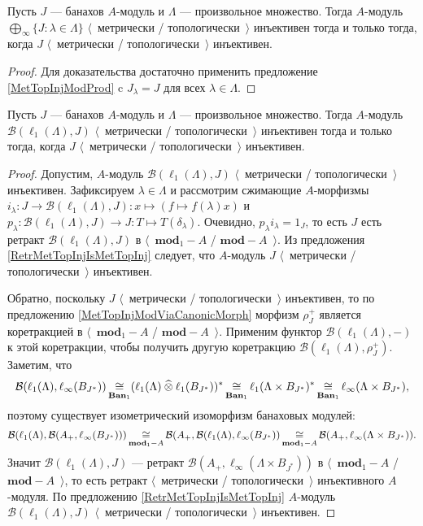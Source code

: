 \begin{corollary}\label{MetTopInjlInftySum} Пусть $J$ --- банахов $A$-модуль и $\Lambda$ --- произвольное множество. Тогда $A$-модуль  $\bigoplus_\infty\{J:\lambda\in\Lambda\}$ $\langle$~метрически / топологически~$\rangle$ инъективен тогда и только тогда, когда $J$ $\langle$~метрически / топологически~$\rangle$ инъективен.
\end{corollary}
\begin{proof} Для доказательства достаточно применить предложение \ref{MetTopInjModProd} c $J_\lambda=J$ для всех $\lambda\in\Lambda$.
\end{proof}

\begin{proposition}\label{MapsFroml1toMetTopInj} Пусть $J$ --- банахов $A$-модуль и $\Lambda$ --- произвольное множество. Тогда $A$-модуль $\mathcal{B}(\ell_1(\Lambda),J)$ $\langle$~метрически / топологически~$\rangle$ инъективен тогда и только тогда, когда $J$ $\langle$~метрически / топологически~$\rangle$ инъективен.
\end{proposition}
\begin{proof} 
Допустим, $A$-модуль $\mathcal{B}(\ell_1(\Lambda), J)$  $\langle$~метрически / топологически~$\rangle$ инъективен. Зафиксируем $\lambda\in\Lambda$ и рассмотрим сжимающие $A$-морфизмы $i_\lambda:J\to\mathcal{B}(\ell_1(\Lambda),J):x\mapsto(f\mapsto f(\lambda)x)$ и $p_\lambda:\mathcal{B}(\ell_1(\Lambda),J)\to J:T\mapsto T(\delta_\lambda)$. Очевидно, $p_\lambda i_\lambda=1_J$, то есть $J$ есть ретракт $\mathcal{B}(\ell_1(\Lambda),J)$ в $\langle$~$\mathbf{mod}_1-A$ / $\mathbf{mod}-A$~$\rangle$. Из предложения \ref{RetrMetTopInjIsMetTopInj} следует, что $A$-модуль $J$ $\langle$~метрически / топологически~$\rangle$ инъективен.

Обратно, поскольку $J$ $\langle$~метрически / топологически~$\rangle$ инъективен, то по предложению \ref{MetTopInjModViaCanonicMorph} морфизм $\rho_J^+$ является коретракцией в $\langle$~$\mathbf{mod}_1-A$ / $\mathbf{mod}-A$~$\rangle$. Применим функтор $\mathcal{B}(\ell_1(\Lambda),-)$ к этой коретракции, чтобы получить другую коретракцию $\mathcal{B}(\ell_1(\Lambda),\rho_J^+)$. Заметим, что 
$$
\mathcal{B}(\ell_1(\Lambda),\ell_\infty(B_{J^*}))\mathop{\mathbin{\cong}}\limits_{\mathbf{Ban}_1}(\ell_1(\Lambda)\mathbin{\widehat{\otimes}} \ell_1(B_{J^*}))^*\mathop{\mathbin{\cong}}\limits_{\mathbf{Ban}_1}\ell_1(\Lambda\times B_{J^*})^*\mathop{\mathbin{\cong}}\limits_{\mathbf{Ban}_1}\ell_\infty(\Lambda\times B_{J^*}),
$$ 
поэтому существует изометрический изоморфизм банаховых модулей:
$$
\mathcal{B}(\ell_1(\Lambda),\mathcal{B}(A_+,\ell_\infty(B_{J^*})))\mathop{\mathbin{\cong}}\limits_{\mathbf{mod}_1-A}\mathcal{B}(A_+,\mathcal{B}(\ell_1(\Lambda),\ell_\infty(B_{J^*}))\mathop{\mathbin{\cong}}\limits_{\mathbf{mod}_1-A}\mathcal{B}(A_+,\ell_\infty(\Lambda\times B_{J^*})).
$$ 
Значит $\mathcal{B}(\ell_1(\Lambda),J)$ --- ретракт $\mathcal{B}(A_+,\ell_\infty(\Lambda\times B_{J^*}))$ в $\langle$~$\mathbf{mod}_1-A$ / $\mathbf{mod}-A$~$\rangle$, то есть ретракт $\langle$~метрически / топологически~$\rangle$ инъективного $A$-модуля. По предложению \ref{RetrMetTopInjIsMetTopInj} $A$-модуль $\mathcal{B}(\ell_1(\Lambda), J)$ $\langle$~метрически / топологически~$\rangle$ инъективен.
\end{proof}

